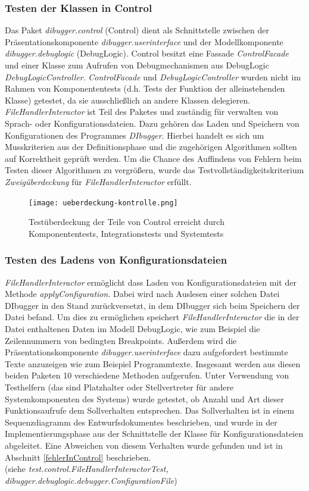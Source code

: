 \documentclass[parskip=full]{scrartcl}
\begin{document}
\subsubsection{Testen der Klassen in Control}
Das Paket \textit{dibugger.control} (Control) dient als Schnittstelle zwischen der Präsentationskomponente \textit{dibugger.userinterface} und der Modellkomponente \textit{dibugger.debuglogic} (DebugLogic).
Control besitzt eine Fassade \textit{ControlFacade} und einer Klasse zum Aufrufen von Debugmechanismen aus DebugLogic \textit{DebugLogicController}.
\textit{ControlFacade} und \textit{DebugLogicController} wurden nicht im Rahmen von Komponententests (d.h. Tests der Funktion der alleinstehenden Klasse) getestet, da sie ausschließlich an andere Klassen delegieren.\\
\textit{FileHandlerInteractor} ist Teil des Paketes und zuständig für verwalten von Sprach- oder Konfigurationsdateien.
Dazu gehören das Laden und Speichern von Konfigurationen des Programmes \textit{DIbugger}.
Hierbei handelt es sich um Musskriterien aus der Definitionsphase und die zugehörigen Algorithmen sollten auf Korrektheit geprüft werden.
Um die Chance des Auffindens von Fehlern beim Testen dieser Algorithmen zu vergrößern, wurde das Testvollständigkeitskriterium \textit{Zweigüberdeckung} für \textit{FileHandlerInteractor} erfüllt.

\begin{figure}[!h]
    \centering
    \texttt{[image: ueberdeckung-kontrolle.png]}
    \caption{Testüberdeckung der Teile von Control erreicht durch Komponententests, Integrationstests und Systemtests}
\end{figure}

\subsubsection{Testen des Ladens von Konfigurationsdateien}
\textit{FileHandlerInteractor} ermöglicht dass Laden von Konfigurationsdateien mit der Methode \textit{applyConfiguration}.
Dabei wird nach Auslesen einer solchen Datei DIbugger in den Stand zurückversetzt, in dem DIbugger sich beim Speichern der Datei befand.
Um dies zu ermöglichen speichert \textit{FileHandlerInteractor} die in der Datei enthaltenen Daten im Modell DebugLogic, wie zum Beispiel die Zeilennummern von bedingten Breakpoints.
Außerdem wird die Präsentationskomponente \textit{dibugger.userinterface} dazu aufgefordert bestimmte Texte anzuzeigen wie zum Beispiel Programmtexte.
Insgesamt werden aus diesen beiden Paketen 10 verschiedene Methoden aufgerufen.
Unter Verwendung von Testhelfern (das sind Platzhalter oder Stellvertreter für andere Systemkomponenten des Systems) wurde getestet, ob Anzahl und Art dieser Funktionsaufrufe dem Sollverhalten entsprechen.
Das Sollverhalten ist in einem Sequenzdiagramm des Entwurfsdokumentes beschrieben, und wurde in der Implementierungsphase aus der Schnittstelle der Klasse für Konfigurationsdateien abgeleitet.
Eine Abweichen von diesem Verhalten wurde gefunden und ist in Abschnitt \ref{fehlerInControl} beschrieben.\\
(siehe \textit{test.control.FileHandlerInteractorTest, dibugger.debuglogic.debugger.ConfigurationFile})
\end{document}
